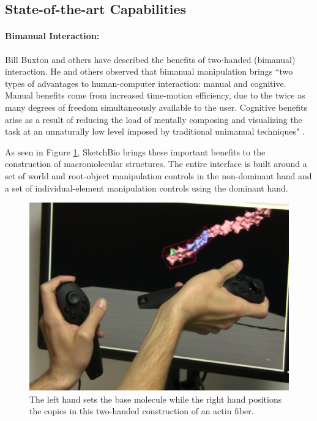 \documentclass[twocolumn]{bmcart}%
\begin{document}
\subsection*{State-of-the-art Capabilities}

\paragraph*{Bimanual Interaction:}
Bill Buxton and others have described the benefits of two-handed (bimanual) interaction.
He and others observed that bimanual manipulation brings ``two types of advantages to human-computer interaction: manual and cognitive. Manual benefits come from increased time-motion efficiency, due to the twice as many degrees of freedom simultaneously available to the user.
Cognitive benefits arise as a result of reducing the load of mentally composing and visualizing the task at an unnaturally low level imposed by traditional unimanual techniques" \cite{Leganchuk1998manual}.

As seen in Figure \ref{fig:two_hands}, SketchBio brings these important benefits to the construction of macromolecular structures.
The entire interface is built around a set of world and root-object manipulation controls in the non-dominant hand and a set of individual-element manipulation controls using the dominant hand.

\begin{figure}[ht]
\centering
\includegraphics[width=0.9\columnwidth]{two_hands.png}
\caption{The left hand sets the base molecule while the right hand positions the copies in this two-handed construction of an actin fiber.}
\label{fig:two_hands}
\end{figure}
\end{document}
